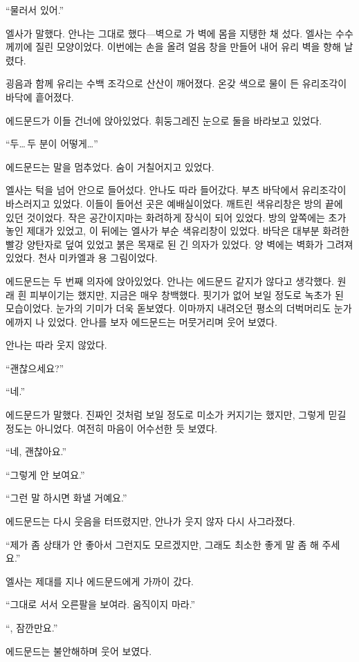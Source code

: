 ``물러서 있어.''

엘사가 말했다. 안나는 그대로 했다—벽으로 가 벽에 몸을 지탱한 채 섰다. 엘사는 수수께끼에 질린 모양이었다. 이번에는 손을 올려 얼음 창을 만들어 내어 유리 벽을 향해 날렸다.

굉음과 함께 유리는 수백 조각으로 산산이 깨어졌다. 온갖 색으로 물이 든 유리조각이 바닥에 흩어졌다.

에드문드가 이들 건너에 앉아있었다. 휘둥그레진 눈으로 둘을 바라보고 있었다.

``두\ldots\,두 분이 어떻게\ldots''

에드문드는 말을 멈추었다. 숨이 거칠어지고 있었다.

엘사는 턱을 넘어 안으로 들어섰다. 안나도 따라 들어갔다. 부츠 바닥에서 유리조각이 바스러지고 있었다. 이들이 들어선 곳은 예배실이었다. 깨트린 색유리창은 방의 끝에 있던 것이었다. 작은 공간이지마는 화려하게 장식이 되어 있었다. 방의 앞쪽에는 초가 놓인 제대가 있었고, 이 뒤에는 엘사가 부순 색유리창이 있었다. 바닥은 대부분 화려한 빨강 양탄자로 덮여 있었고 붉은 목재로 된 긴 의자가 있었다. 양 벽에는 벽화가 그려져 있었다. 천사 미카엘과 용 그림이었다.

에드문드는 두 번째 의자에 앉아있었다. 안나는 에드문드 같지가 않다고 생각했다. 원래 흰 피부이기는 했지만, 지금은 매우 창백했다. 핏기가 없어 보일 정도로 녹초가 된 모습이었다. 눈가의 기미가 더욱 돋보였다. 이마까지 내려오던 평소의 더벅머리도 눈가에까지 나 있었다. 안나를 보자 에드문드는 머뭇거리며 웃어 보였다.

안나는 따라 웃지 않았다.

``괜찮으세요?''

``네.''

에드문드가 말했다. 진짜인 것처럼 보일 정도로 미소가 커지기는 했지만, 그렇게 믿길 정도는 아니었다. 여전히 마음이 어수선한 듯 보였다.

``네, 괜찮아요.''

``그렇게 안 보여요.''

``그런 말 하시면 화낼 거예요.''

에드문드는 다시 웃음을 터뜨렸지만, 안나가 웃지 않자 다시 사그라졌다.

``제가 좀 상태가 안 좋아서 그런지도 모르겠지만, 그래도 최소한 좋게 말 좀 해 주세요.''

엘사는 제대를 지나 에드문드에게 가까이 갔다.

``그대로 서서 오른팔을 보여라. 움직이지 마라.''

``, 잠깐만요.''

에드문드는 불안해하며 웃어 보였다.

